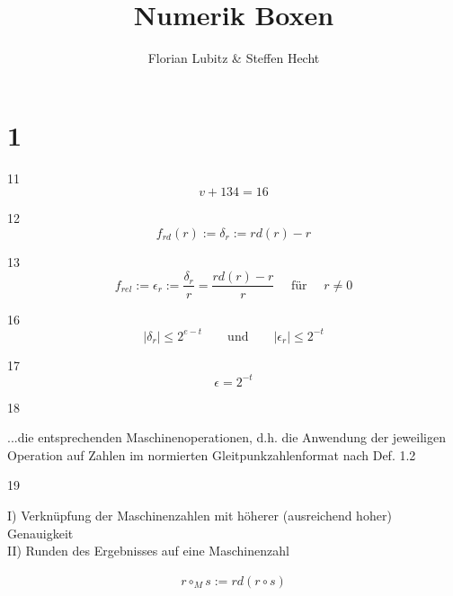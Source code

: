 \documentclass[13pt]{scrreprt}
\title{Numerik Boxen}
\author{Florian Lubitz \& Steffen Hecht}
\begin{document}
\maketitle

\begin{abstract}
\end{abstract}


\chapter{1}

11
\begin{equation*}
v + 134 = 16
\end{equation*}
	
12
\begin{equation*}
f_{rd}(r):= \delta_{r}:=rd(r)-r
\end{equation*}

13
\begin{equation*}
f_{rel}:=\epsilon_{r}:= \frac{\delta_{r}}{r}=\frac{rd(r) -r}{r} \quad\text{ für }\quad r \ne 0
\end{equation*}



16
\begin{equation*}
|\delta_{r}| \leqslant 2^{e-t} \qquad \text{und} \qquad  |\epsilon_{r}| \leqslant 2^{-t}
\end{equation*}

17
\begin{equation*}
\epsilon = 2^{-t}
\end{equation*}

18

...die entsprechenden Maschinenoperationen, d.h. die Anwendung der jeweiligen Operation auf Zahlen im normierten Gleitpunkzahlenformat nach Def. 1.2

19

I) Verknüpfung der Maschinenzahlen mit höherer (ausreichend hoher) Genauigkeit\\
II) Runden des Ergebnisses auf eine Maschinenzahl

\begin{ebox}{20}
	\begin{align*}
	r \circ _{M}s := rd(r \circ s)
	\end{align*}
\end{ebox}
\end{document}
